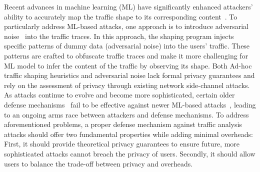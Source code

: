 Recent advances in machine learning (ML) have significantly enhanced attackers' ability to accurately map the traffic shape to its corresponding content~\cite{schuster2017beautyburst, bhat2019varcnn, sirinam2018df}.
To particularly address ML-based attacks, one approach is to introduce adversarial noise~\cite{shan2021dolos, nasr2021blind, rahman2020mockingbird} into the traffic traces.
In this approach, the shaping program injects specific patterns of dummy data (\ie adversarial noise) into the users' traffic.
These patterns are crafted to obfuscate traffic traces and make it more challenging for ML model to infer the content of the traffic by observing its shape. 
Both Ad-hoc traffic shaping heuristics and adversarial noise lack formal privacy guarantees and rely on the assessment of privacy through existing network side-channel attacks.
As attacks continue to evolve and become more sophisticated, certain older defense mechanisms~\cite{wang2017walkie,cai2014csbuflo} fail to be effective against newer ML-based attacks~\cite{sirinam2018df}, leading to an ongoing arms race between attackers and defense mechanisms.
To address aforementioned problems, a proper defense mechanism against traffic analysis attacks should offer two fundamental properties while adding minimal overheads: 
First, it should provide theoretical privacy guarantees to ensure future, more sophisticated attacks cannot breach the privacy of users.
Secondly, it should allow users to balance the trade-off between privacy and overheads.





